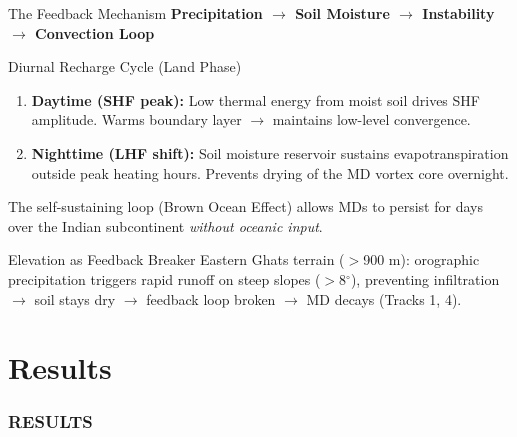 \documentclass[10pt, aspectratio=169,t,xcolor=table]{beamer}
\begin{document}
\begin{frame}{The Feedback Mechanism}
	\textbf{\small Precipitation $\rightarrow$ Soil Moisture $\rightarrow$ Instability $\rightarrow$ Convection Loop}
	\vspace{0.2cm}
	\begin{block}{\small Diurnal Recharge Cycle (Land Phase)}
		\footnotesize
		\begin{enumerate}
			\item \textbf{Daytime (SHF peak):} Low thermal energy from moist soil drives SHF amplitude.
			      Warms boundary layer $\to$ maintains low-level convergence.
			\item \textbf{Nighttime (LHF shift):} Soil moisture reservoir sustains
			      evapotranspiration outside peak heating hours.
			      Prevents drying of the MD vortex core overnight.
		\end{enumerate}
		The self-sustaining loop (Brown Ocean Effect) allows MDs to persist
		for days over the Indian subcontinent \textit{without oceanic input}.
	\end{block}

	\begin{alertblock}{\small Elevation as Feedback Breaker}
		\scriptsize
		Eastern Ghats terrain ($>$900 m): orographic precipitation triggers rapid runoff
		on steep slopes ($>$8$^\circ$), preventing infiltration $\to$ soil stays dry
		$\to$ feedback loop broken $\to$ MD decays (Tracks 1, 4).
	\end{alertblock}
\end{frame}

\section{Results}
\begin{frame}{}
	\frametitle{RESULTS}
\end{frame}

\end{document}
